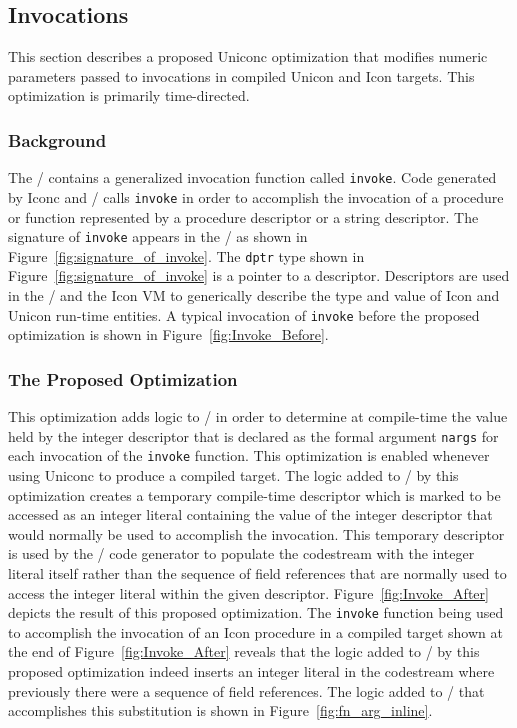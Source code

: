 \subsection{Invocations}
This section describes a proposed Uniconc optimization that modifies numeric
parameters passed to invocations in compiled Unicon and Icon targets. This
optimization is primarily time-directed.

\subsubsection{Background}
The \Rtl/ contains a generalized invocation function called \texttt{invoke}.
Code generated by Iconc and \Ic/ calls \texttt{invoke} in order to accomplish
the invocation of a procedure or function represented by a procedure descriptor
or a string descriptor. The signature of \texttt{invoke} appears in the \Rtl/ as
shown in Figure~\ref{fig:signature_of_invoke}.  The \texttt{dptr} type shown in
Figure~\ref{fig:signature_of_invoke} is a pointer to a descriptor. Descriptors
are used in the \Rtl/ and the Icon VM to generically describe the type and value
of Icon and Unicon \mbox{run-time} entities. A typical invocation of \texttt{invoke}
before the proposed optimization is shown in Figure~\ref{fig:Invoke_Before}.

\subsubsection{The Proposed Optimization}
This optimization adds logic to \Ic/ in order to determine at \mbox{compile-time} the value
held by the integer descriptor that is declared as the formal argument
\texttt{nargs} for each invocation of the \texttt{invoke} function. This
optimization is enabled whenever using Uniconc to produce a compiled target. The
logic added to \Ic/ by this optimization creates a temporary \mbox{compile-time} descriptor
which is marked to be accessed as an integer literal containing the value of the
integer descriptor that would normally be used to accomplish the invocation. 
This temporary descriptor is used by the \Ic/ code generator to populate the
codestream with the integer literal itself rather than the sequence of field
references that are normally used to access the integer literal within the given
descriptor. Figure~\ref{fig:Invoke_After} depicts the result of this proposed
optimization. The \texttt{invoke} function being used to accomplish the
invocation of an Icon procedure in a compiled target shown at the end of
Figure~\ref{fig:Invoke_After} reveals that the logic added to \Ic/ by this
proposed optimization indeed inserts an integer literal in the codestream where
previously there were a sequence of field references. The logic added to \Ic/
that accomplishes this substitution is shown in Figure~\ref{fig:fn_arg_inline}.

